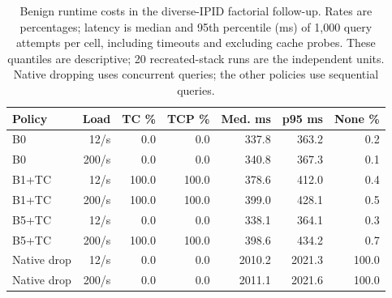 \begin{table}[t]
\centering
\caption{Benign runtime costs in the diverse-IPID factorial follow-up. Rates are percentages; latency is median and 95th percentile (ms) of 1,000 query attempts per cell, including timeouts and excluding cache probes. These quantiles are descriptive; 20 recreated-stack runs are the independent units. Native dropping uses concurrent queries; the other policies use sequential queries.}
\label{tab:benign-cost-factorial}
\begingroup\fontsize{9}{10.8}\selectfont
\setlength{\tabcolsep}{3pt}
\begin{tabular}{lrrrrrr}
\hline
Policy & Load & TC \% & TCP \% & Med. ms & p95 ms & None \% \\
\hline
B0 & 12/s & 0.0 & 0.0 & 337.8 & 363.2 & 0.2 \\
B0 & 200/s & 0.0 & 0.0 & 340.8 & 367.3 & 0.1 \\
B1+TC & 12/s & 100.0 & 100.0 & 378.6 & 412.0 & 0.4 \\
B1+TC & 200/s & 100.0 & 100.0 & 399.0 & 428.1 & 0.5 \\
B5+TC & 12/s & 0.0 & 0.0 & 338.1 & 364.1 & 0.3 \\
B5+TC & 200/s & 100.0 & 100.0 & 398.6 & 434.2 & 0.7 \\
Native drop & 12/s & 0.0 & 0.0 & 2010.2 & 2021.3 & 100.0 \\
Native drop & 200/s & 0.0 & 0.0 & 2011.1 & 2021.6 & 100.0 \\
\hline
\end{tabular}
\endgroup
\end{table}
